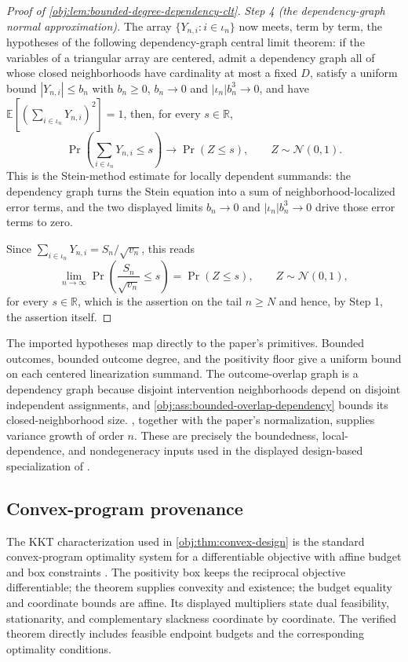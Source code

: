 \documentclass[11pt]{article}
\begin{document}
\begin{proof}[Proof of \cref{obj:lem:bounded-degree-dependency-clt}]
\textit{Step 4 (the dependency-graph normal approximation).} The array \(\{Y_{n,i}:i\in\iota_n\}\) now meets, term by term, the hypotheses of the following dependency-graph central limit theorem: if the variables of a triangular array are centered, admit a dependency graph all of whose closed neighborhoods have cardinality at most a fixed \(D\), satisfy a uniform bound \(|Y_{n,i}|\le b_n\) with \(b_n\ge0\), \(b_n\to0\) and \(|\iota_n|b_n^{3}\to0\), and have
\(\mathbb E[(\sum_{i\in\iota_n}Y_{n,i})^{2}]=1\), then, for every \(s\in\mathbb R\),
\[
\Pr\!\left(\sum_{i\in\iota_n}Y_{n,i}\le s\right)
\longrightarrow
\Pr\!\left(Z\le s\right),
\qquad Z\sim\mathcal N(0,1).
\]
This is the Stein-method estimate for locally dependent summands: the dependency graph turns the Stein equation into a sum of neighborhood-localized error terms, and the two displayed limits \(b_n\to0\) and \(|\iota_n|b_n^{3}\to0\) drive those error terms to zero.

Since \(\sum_{i\in\iota_n}Y_{n,i}=S_n/\sqrt{v_n}\), this reads
\[
\lim_{n\to\infty}\Pr\!\left(\frac{S_n}{\sqrt{v_n}}\le s\right)
=\Pr\!\left(Z\le s\right),
\qquad Z\sim\mathcal N(0,1),
\]
for every \(s\in\mathbb R\), which is the assertion on the tail \(n\ge N\) and hence, by Step 1, the assertion itself.
\end{proof}

The imported hypotheses map directly to the paper's primitives. Bounded outcomes, bounded outcome degree, and the positivity floor give a uniform bound on each centered linearization summand. The outcome-overlap graph is a dependency graph because disjoint intervention neighborhoods depend on disjoint independent assignments, and \cref{obj:ass:bounded-overlap-dependency} bounds its closed-neighborhood size. , together with the paper's normalization, supplies variance growth of order \(n\). These are precisely the boundedness, local-dependence, and nondegeneracy inputs used in the displayed design-based specialization of \citet{BaldiRinott1989}.

\subsection{Convex-program provenance}

The KKT characterization used in \cref{obj:thm:convex-design} is the standard convex-program optimality system for a differentiable objective with affine budget and box constraints \citep[Chs.~4--5]{BoydVandenberghe2004}. The positivity box keeps the reciprocal objective differentiable; the theorem supplies convexity and existence; the budget equality and coordinate bounds are affine. Its displayed multipliers state dual feasibility, stationarity, and complementary slackness coordinate by coordinate. The verified theorem directly includes feasible endpoint budgets and the corresponding optimality conditions.
\end{document}
